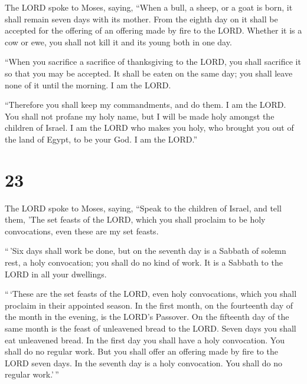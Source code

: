  The LORD spoke to Moses, saying,  ``When a
bull, a sheep, or a goat is born, it shall remain seven days with its
mother. From the eighth day on it shall be accepted for the offering of
an offering made by fire to the LORD.  Whether it is a cow
or ewe, you shall not kill it and its young both in one day.

 ``When you sacrifice a sacrifice of thanksgiving to the
LORD, you shall sacrifice it so that you may be accepted. 
It shall be eaten on the same day; you shall leave none of it until the
morning. I am the LORD.

 ``Therefore you shall keep my commandments, and do them. I
am the LORD.  You shall not profane my holy name, but I
will be made holy amongst the children of Israel. I am the LORD who
makes you holy,  who brought you out of the land of Egypt,
to be your God. I am the LORD.''

\hypertarget{section-22}{%
\section{23}\label{section-22}}

 The LORD spoke to Moses, saying,  ``Speak to
the children of Israel, and tell them, 'The set feasts of the LORD,
which you shall proclaim to be holy convocations, even these are my set
feasts.

 ``\,'Six days shall work be done, but on the seventh day is
a Sabbath of solemn rest, a holy convocation; you shall do no kind of
work. It is a Sabbath to the LORD in all your dwellings.

 ``\,`These are the set feasts of the LORD, even holy
convocations, which you shall proclaim in their appointed season.
 In the first month, on the fourteenth day of the month in
the evening, is the LORD's Passover.  On the fifteenth day
of the same month is the feast of unleavened bread to the LORD. Seven
days you shall eat unleavened bread.  In the first day you
shall have a holy convocation. You shall do no regular work.
 But you shall offer an offering made by fire to the LORD
seven days. In the seventh day is a holy convocation. You shall do no
regular work.'\,''

